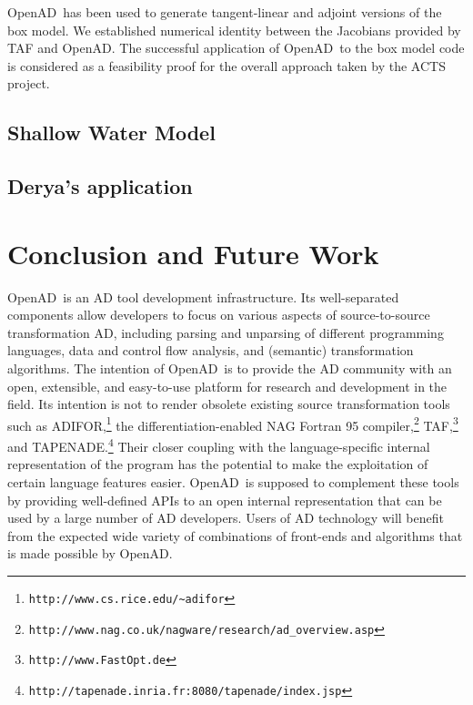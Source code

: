 \documentclass[11pt]{article}
\newcommand{\OpenAD}{OpenAD}
\begin{document}
\OpenAD\ has been used to generate tangent-linear and 
adjoint versions of the box model. We established numerical identity between
the Jacobians provided by TAF and \OpenAD.
The successful 
application of \OpenAD\ to the box model code is considered as a feasibility 
proof for the overall approach taken by the ACTS project.  
\subsection{Shallow Water Model}
\subsection{Derya's application}
\section*{Conclusion and Future Work}

\OpenAD\ is an AD tool development infrastructure. Its well-separated components
allow developers to focus on various aspects of source-to-source 
transformation AD, including parsing and unparsing of different programming
languages, data and control flow analysis, and (semantic) transformation 
algorithms. The intention of \OpenAD\ is to provide the AD community with 
an open, extensible, and easy-to-use platform for research and development
in the field. Its intention is not to render obsolete existing source transformation
tools such as ADIFOR,\footnote{{\tt http://www.cs.rice.edu/\~\!adifor}} 
the differentiation-enabled NAG Fortran 95 
compiler,\footnote{{\tt http://www.nag.co.uk/nagware/research/ad\_overview.asp}} TAF,\footnote{{\tt http://www.FastOpt.de}} and TAPENADE.\footnote{{\tt http://tapenade.inria.fr:8080/tapenade/index.jsp}} 
Their closer coupling with the language-specific internal representation of 
the program has the potential to make the
exploitation of certain language features easier. \OpenAD\ is supposed to 
complement these tools by providing well-defined APIs to an open internal 
representation that can be used by a large number of AD developers.
Users of AD technology will benefit from the expected wide
variety of combinations of front-ends and algorithms that is made possible
by \OpenAD.
\end{document}
